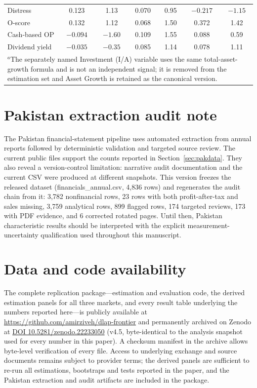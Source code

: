 \documentclass[12pt]{article}
\begin{document}
\begin{table}[htbp]
\begin{tabular}{l cc cc cc}
Distress & 0.123 & 1.13 & 0.070 & 0.95 & $-0.217$ & $-1.15$ \\
O-score & 0.132 & 1.12 & 0.068 & 1.50 & 0.372 & 1.42 \\
Cash-based OP & $-0.094$ & $-1.60$ & 0.109 & 1.55 & 0.088 & 0.59 \\
Dividend yield & $-0.035$ & $-0.35$ & 0.085 & 1.14 & 0.078 & 1.11 \\
\bottomrule
\multicolumn{7}{p{14.5cm}}{\footnotesize $^{a}$The separately named Investment (I/A) variable uses the same total-asset-growth formula and is not an independent signal; it is removed from the estimation set and Asset Growth is retained as the canonical version.} \\
\end{tabular}
\end{table}

\clearpage
\section{Pakistan extraction audit note}\label{app:pakaudit}

The Pakistan financial-statement pipeline uses automated extraction from annual reports followed by deterministic validation and targeted source review. The current public files support the counts reported in Section~\ref{sec:pakdata}. They also reveal a version-control limitation: narrative audit documentation and the current CSV were produced at different snapshots. This version freezes the released dataset (financials\_annual.csv, 4,836 rows) and regenerates the audit chain from it: 3,782 nonfinancial rows, 23 rows with both profit-after-tax and sales missing, 3,759 analytical rows, 899 flagged rows, 174 targeted reviews, 173 with PDF evidence, and 6 corrected rotated pages. Until then, Pakistan characteristic results should be interpreted with the explicit measurement-uncertainty qualification used throughout this manuscript.

\section*{Data and code availability}

The complete replication package---estimation and evaluation code, the derived estimation panels for all three markets, and every result table underlying the numbers reported here---is publicly available at \url{https://github.com/amirziveh/dlap-frontier} and permanently archived on Zenodo at \href{https://doi.org/10.5281/zenodo.22233050}{DOI 10.5281/zenodo.22233050} (v4.5, byte-identical to the analysis snapshot used for every number in this paper). A checksum manifest in the archive allows byte-level verification of every file. Access to underlying exchange and source documents remains subject to provider terms; the derived panels are sufficient to re-run all estimations, bootstraps and tests reported in the paper, and the Pakistan extraction and audit artifacts are included in the package.


\end{document}
